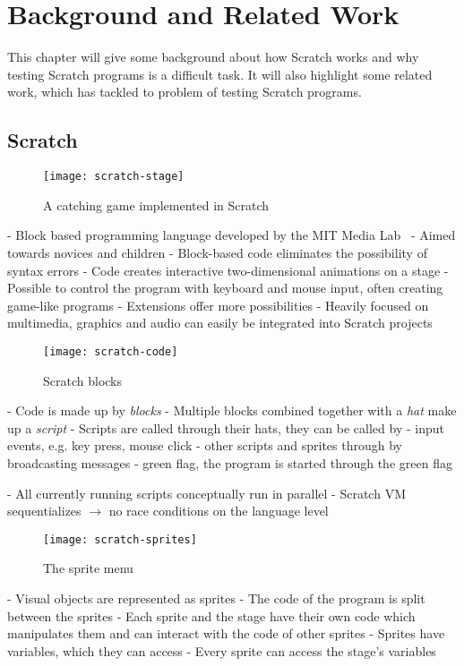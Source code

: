 \chapter{Background and Related Work}

This chapter will give some background about how Scratch works and why testing Scratch programs is a difficult task.
It will also highlight some related work, which has tackled to problem of testing Scratch programs.

\section{Scratch}

\begin{wrapfigure}{r}{0.35\textwidth + 5mm}
    \centering
    \vspace{-3mm}
    \texttt{[image: scratch-stage]}
    \caption{A catching game implemented in Scratch}
    \label{fig:a_catching_game_implemented_in_scratch}
\end{wrapfigure}
- Block based programming language developed by the MIT Media Lab~\cite{scratch}
- Aimed towards novices and children
- Block-based code eliminates the possibility of syntax errors
- Code creates interactive two-dimensional animations on a stage
- Possible to control the program with keyboard and mouse input, often creating game-like programs
    - Extensions offer more possibilities
- Heavily focused on multimedia, graphics and audio can easily be integrated into Scratch projects
\parspace

\begin{wrapfigure}{r}{0.45\textwidth + 5mm}
    \centering
    \vspace{-3mm}
    \texttt{[image: scratch-code]}
    \caption{Scratch blocks}
    \label{fig:scratch_blocks}
\end{wrapfigure}
- Code is made up by \textit{blocks}
- Multiple blocks combined together with a \textit{hat} make up a \textit{script}
- Scripts are called through their hats, they can be called by
    - input events, e.g. key press, mouse click
    - other scripts and sprites through by broadcasting messages
    - green flag, the program is started through the green flag

- All currently running scripts conceptually run in parallel
- Scratch VM sequentializes $\rightarrow$ no race conditions on the language level
\parspace

\begin{wrapfigure}{r}{0.45\textwidth + 5mm}
    \centering
    \vspace{-4mm}
    \texttt{[image: scratch-sprites]}
    \caption{The sprite menu}
    \label{fig:the_sprite_menu}
\end{wrapfigure}
- Visual objects are represented as sprites
- The code of the program is split between the sprites
- Each sprite and the stage have their own code which manipulates them and can interact with the code of other sprites
- Sprites have variables, which they can access
- Every sprite can access the stage's variables
\parspace

